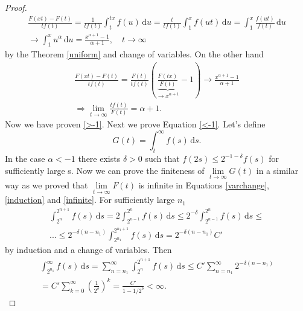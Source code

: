 \documentclass[english,12pt,a4paper,pdftex,sci,utf8]{aaltothesis} %
\begin{document}
\begin{proof}
\begin{equation*}
\begin{split}
\frac{F(xt)-F(t)}{tf(t)} = \frac{1}{tf(t)} \int_{t}^{tx}f(u)\, \mathrm{d}u = \frac{t}{tf(t)} \int_{1}^{x} f(ut)\, \mathrm{d}u = \int_1^x \frac{f(ut)}{f(t)}\, \mathrm{d}u \\
\rightarrow \int_1^x u^{\alpha}\, \mathrm{d}u = \frac{x^{\alpha+1}-1}{\alpha+1}, \quad t \rightarrow \infty
\end{split}
\end{equation*}
by the Theorem \ref{uniform} and change of variables. On the other hand 
\begin{equation*}
\begin{split}
\frac{F(xt)-F(t)}{tf(t)} = \frac{F(t)}{tf(t)}\left(\underbrace{\frac{F(tx)}{F(t)}}_{\rightarrow x^{\alpha+1}} - 1\right) \rightarrow \frac{x^{\alpha+1}-1}{\alpha+1} \\
\Rightarrow \lim_{t \rightarrow \infty} \frac{tf(t)}{F(t)}= \alpha + 1.
\end{split}
\end{equation*}
Now we have proven \eqref{>-1}. Next we prove Equation \eqref{<-1}. Let's define
\begin{equation*}
G(t) = \int_{t}^{\infty} f(s)\,\mathrm{d}s.
\end{equation*}
In the case $\alpha<-1$ there exists $\delta>0$ such that $f(2s) \leq 2^{-1-\delta}f(s)$ for sufficiently large s. Now we can prove the finiteness of $\lim\limits_{t \rightarrow \infty} G(t)$ in a similar way as we proved that $\lim\limits_{t \rightarrow \infty} F(t)$ is infinite in Equations \eqref{varchange}, \eqref{induction} and \eqref{infinite}. For sufficiently large $n_1$
\begin{equation*}
\begin{split}
\int_{2^{n}}^{2^{n+1}} f(s)\,\mathrm{d}s = 2 \int_{2^{n-1}}^{2^{n}} f(s)\,\mathrm{d}s \leq 2^{-\delta} \int_{2^{n-1}}^{2^n} f(s)\,\mathrm{d}s \leq \\ ... \leq 2^{-\delta(n-n_1)} \int_{2^{n_1}}^{2^{n_1+1}} f(s)\,\mathrm{d}s = 2^{-\delta(n-n_1)} C'
\end{split}
\end{equation*}
by induction and a change of variables. Then
\begin{equation*}
\begin{split}
\int_{2^{n_1}}^{\infty} f(s)\,\mathrm{d}s = \sum_{n=n_1}^{\infty} \int_{2^{n}}^{2^{n+1}} f(s)\,\mathrm{d}s \leq C' \sum_{n=n_1}^{\infty} 2^{-\delta(n-n_1)} \\
=C' \sum_{k=0}^{\infty} \left( \frac{1}{2^{\delta}}\right)^k = \frac{C'}{1-1/2^{\delta}}<\infty.

\end{split}
\end{equation*}
\end{proof}
\end{document}
